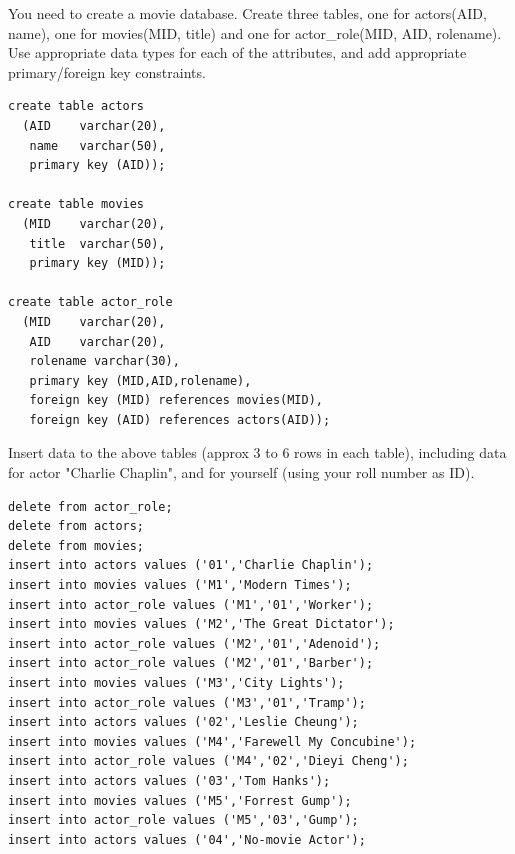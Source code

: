 \documentclass[logo,reportComp]{thesis}
\begin{document}
\begin{question}
\normalfont 
You need to create a movie database. Create three tables, one for actors(AID, name), one for movies(MID, title) and one for actor\_role(MID, AID, rolename). Use appropriate data types for each of the attributes, and add appropriate primary/foreign key constraints.
\end{question}
\begin{answer}\mbox{}\par
\begin{lstlisting}
create table actors
  (AID    varchar(20),
   name   varchar(50),
   primary key (AID));

create table movies
  (MID    varchar(20),
   title  varchar(50),
   primary key (MID));

create table actor_role
  (MID    varchar(20),
   AID    varchar(20),
   rolename varchar(30),
   primary key (MID,AID,rolename),
   foreign key (MID) references movies(MID),
   foreign key (AID) references actors(AID));
\end{lstlisting}
\end{answer}

\begin{question}
\normalfont 
Insert data to the above tables (approx 3 to 6 rows in each table), including data for actor "Charlie Chaplin", and for yourself (using your roll number as ID).
\end{question}
\begin{answer}\mbox{}\par
\begin{lstlisting}
delete from actor_role;
delete from actors;
delete from movies;
insert into actors values ('01','Charlie Chaplin');
insert into movies values ('M1','Modern Times');
insert into actor_role values ('M1','01','Worker');
insert into movies values ('M2','The Great Dictator');
insert into actor_role values ('M2','01','Adenoid');
insert into actor_role values ('M2','01','Barber');
insert into movies values ('M3','City Lights');
insert into actor_role values ('M3','01','Tramp');
insert into actors values ('02','Leslie Cheung');
insert into movies values ('M4','Farewell My Concubine');
insert into actor_role values ('M4','02','Dieyi Cheng');
insert into actors values ('03','Tom Hanks');
insert into movies values ('M5','Forrest Gump');
insert into actor_role values ('M5','03','Gump');
insert into actors values ('04','No-movie Actor');
\end{lstlisting}
\end{answer}
\end{document}
